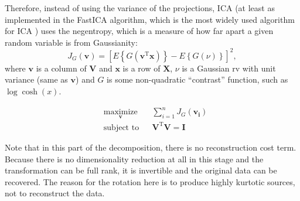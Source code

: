 \documentclass{article}
\newcommand{\transpose}{^\mathrm{T}}
\begin{document}
Therefore, instead of using the variance of the projections, ICA (at least as implemented in the FastICA algorithm, which is the most widely used algorithm for ICA \cite{hyvarinen_fast_1999,hyvarinen_independent_2000}) uses the negentropy, which is a measure of how far apart a given random variable is from Gaussianity: 
\begin{equation}
J_G \left( \mathbf{v}\right) = \left[ E \left\lbrace G \left( \mathbf{v}\transpose \mathbf{x}\right) \right\rbrace - E \left\lbrace G \left( \nu \right) \right\rbrace \right]^2,
\end{equation}
where $\mathbf{v}$ is a column of $\mathbf{V}$ and $\mathbf{x}$ is a row of $\mathbf{X}$,  $\nu$ is a Gaussian rv with unit variance (same as $\mathbf{v}$) and $G$ is some non-quadratic  ``contrast'' function, such as $\log \cosh (x)$. 

 \begin{equation}
\begin{aligned}
&\underset{\mathbf{v}}{\text{maximize}} && \sum_{i=1}^n J_G \left( \mathbf{v_i} \right) \\ 
& \text{subject to} & & \mathbf{V}\transpose\mathbf{V} = \mathbf{I}
\end{aligned}
\end{equation}

Note that in this part of the decomposition, there is no reconstruction cost term.  Because there is no dimensionality reduction at all in this stage and the transformation can be full rank, it is invertible and the original data can be recovered.  The reason for the rotation here is to produce highly kurtotic sources, not to reconstruct the data.   
\end{document}
